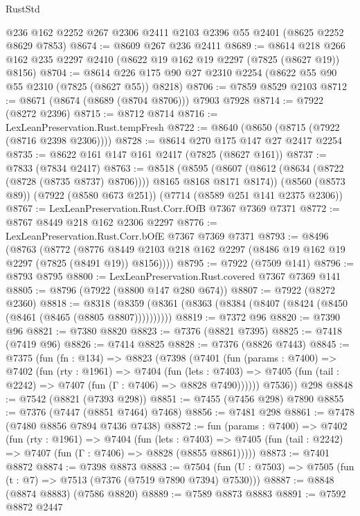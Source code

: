 \begin{lexlean}{RustStd}
\begin{coremodule}
    @236
    @162
    @2252
    @267
    @2306
    @2411
    @2103
    @2396
    @55
    @2401
    (@8625 @2252 @8629 @7853)
@8674 := @8609 @267 @236 @2411
@8689 := @8614 @218 @266 @162 @235 @2297 @2410 (@8622 @19 @162 @19 @2297 (@7825 (@8627 @19)) @8156)
@8704 := @8614 @226 @175 @90 @27 @2310 @2254 (@8622 @55 @90 @55 @2310 (@7825 (@8627 @55)) @8218)
@8706 := @7859 @8529 @2103
@8712 := @8671 (@8674 (@8689 (@8704 @8706))) @7903 @7928
@8714 := @7922 (@8272 @2396)
@8715 := @8712 @8714
@8716 := LexLeanPreservation.Rust.tempFresh
@8722 := @8640 (@8650 (@8715 (@7922 (@8716 @2398 @2306))))
@8728 := @8614 @270 @175 @147 @27 @2417 @2254
@8735 := @8622 @161 @147 @161 @2417 (@7825 (@8627 @161))
@8737 := @7833 (@7834 @2417)
@8763 := @8518
    (@8595 (@8607 (@8612 (@8634 (@8722 (@8728 (@8735 @8737) @8706)))) @8165 @8168 @8171 @8174))
    (@8560 (@8573 @89))
    (@7922 (@8580 @673 @251))
    (@7714 (@8589 @251 @141 @2375 @2306))
@8767 := LexLeanPreservation.Rust.Corr.fOfB @7367 @7369 @7371
@8772 := @8767 @8449 @218 @162 @2306 @2297
@8776 := LexLeanPreservation.Rust.Corr.bOfE @7367 @7369 @7371
@8793 := @8496
    (@8763
      (@8772
        (@8776 @8449 @2103 @218 @162 @2297 (@8486 @19 @162 @19 @2297 (@7825 (@8491 @19)) @8156))))
@8795 := @7922 (@7509 @141)
@8796 := @8793 @8795
@8800 := LexLeanPreservation.Rust.covered @7367 @7369 @141
@8805 := @8796 (@7922 (@8800 @147 @280 @674))
@8807 := @7922 (@8272 @2360)
@8818 := @8318 (@8359 (@8361 (@8363 (@8384 (@8407 (@8424 (@8450 (@8461 (@8465 (@8805 @8807))))))))))
@8819 := @7372 @96
@8820 := @7390 @96
@8821 := @7380 @8820
@8823 := @7376 (@8821 @7395)
@8825 := @7418 (@7419 @96)
@8826 := @7414 @8825
@8828 := @7376 (@8826 @7443)
@8845 := @7375
    (fun (fn : @134) =>
    @8823
      (@7398
        (@7401
          (fun (params : @7400) =>
          @7402
            (fun (rty : @1961) =>
            @7404
              (fun (lets : @7403) =>
              @7405 (fun (tail : @2242) => @7407 (fun (Γ : @7406) => @8828 @7490))))))
        @7536))
    @298
@8848 := @7542 (@8821 (@7393 @298))
@8851 := @7455 (@7456 @298) @7890
@8855 := @7376 (@7447 (@8851 @7464) @7468)
@8856 := @7481 @298
@8861 := @7478 (@7480 @8856 @7894 @7436 @7438)
@8872 := fun (params : @7400) =>
  @7402
    (fun (rty : @1961) =>
    @7404
      (fun (lets : @7403) =>
      @7405 (fun (tail : @2242) => @7407 (fun (Γ : @7406) => @8828 (@8855 @8861)))))
@8873 := @7401 @8872
@8874 := @7398 @8873
@8883 := @7504 (fun (U : @7503) => @7505 (fun (t : @7) => @7513 (@7376 (@7519 @7890 @7394) @7530)))
@8887 := @8848 (@8874 @8883) (@7586 @8820)
@8889 := @7589 @8873 @8883
@8891 := @7592 @8872 @2447

\end{coremodule}
\end{lexlean}
